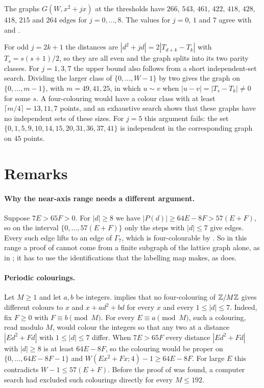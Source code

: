 \documentclass[11pt,colorlinks]{charlie}
\begin{document}
The graphs $G(W,x^2+jx)$ at the thresholds have $266$, $543$, $461$, $422$, $418$, $428$, $418$, $215$ and $264$ edges for $j=0,\dots,8$. The values for $j=0$, $1$ and $7$ agree with \cite{CCFGMS} and \cite[Theorem~2.3 and Proposition~2.9]{KGRW}.

\begin{remark}\label{rem:odd}
For odd $j=2k+1$ the distances are $|d^2+jd|=2|T_{d+k}-T_k|$ with $T_s=s(s+1)/2$, so they are all even and the graph splits into its two parity classes. For $j=1,3,7$ the upper bound also follows from a short independent-set search. Dividing the larger class of $\{0,\dots,W-1\}$ by two gives the graph on $\{0,\dots,m-1\}$, with $m=49,41,25$, in which $u\sim v$ when $|u-v|=|T_s-T_k|\ne0$ for some $s$. A four-colouring would have a colour class with at least $\lceil m/4\rceil=13,11,7$ points, and an exhaustive search shows that these graphs have no independent sets of these sizes. For $j=5$ this argument fails: the set $\{0,1,5,9,10,14,15,20,31,36,37,41\}$ is independent in the corresponding graph on $45$ points.
\end{remark}

\section{Remarks}\label{sec:remarks}

\paragraph{Why the near-axis range needs a different argument.}
Suppose $7E>65F>0$. For $|d|\ge8$ we have $|P(d)|\ge64E-8F>57(E+F)$, so on the interval $\{0,\dots,57(E+F)\}$ only the steps with $|d|\le7$ give edges. Every such edge lifts to an edge of $\Gamma_7$, which is four-colourable by . So in this range a proof of  cannot come from a finite subgraph of the lattice graph alone, as in ; it has to use the identifications that the labelling map makes, as  does.

\paragraph{Periodic colourings.}
Let $M\ge1$ and let $a,b$ be integers.  implies that no four-colouring of $\mathbb{Z}/M\mathbb{Z}$ gives different colours to $x$ and $x+ad^2+bd$ for every $x$ and every $1\le|d|\le7$. Indeed, fix $F\ge0$ with $F\equiv b\pmod M$. For every $E\equiv a\pmod M$, such a colouring, read modulo $M$, would colour the integers so that any two at a distance $|Ed^2+Fd|$ with $1\le|d|\le7$ differ. When $7E>65F$ every distance $|Ed^2+Fd|$ with $|d|\ge8$ is at least $64E-8F$, so the colouring would be proper on $\{0,\dots,64E-8F-1\}$ and $W(Ex^2+Fx;4)-1\ge64E-8F$. For large $E$ this contradicts $W-1\le57(E+F)$. Before the proof of  was found, a computer search had excluded such colourings directly for every $M\le192$.
\end{document}
